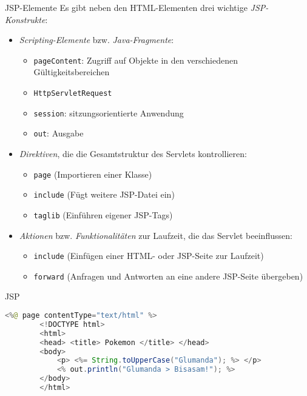 \begin{bonus}{JSP-Elemente}
    Es gibt neben den HTML-Elementen drei wichtige \emph{JSP-Konstrukte}:
    \begin{itemize}
        \item \emph{Scripting-Elemente} bzw. \emph{Java-Fragmente}:
              \begin{itemize}
                  \item \texttt{pageContent}: Zugriff auf Objekte in den verschiedenen Gültigkeitsbereichen
                  \item \texttt{HttpServletRequest}
                  \item \texttt{session}: sitzungsorientierte Anwendung
                  \item \texttt{out}: Ausgabe
              \end{itemize}
        \item \emph{Direktiven}, die die Gesamtstruktur des Servlets kontrollieren:
              \begin{itemize}
                  \item \texttt{page} (Importieren einer Klasse)
                  \item \texttt{include} (Fügt weitere JSP-Datei ein)
                  \item \texttt{taglib} (Einführen eigener JSP-Tags)
              \end{itemize}
        \item \emph{Aktionen} bzw. \emph{Funktionalitäten} zur Laufzeit, die das Servlet beeinflussen:
              \begin{itemize}
                  \item \texttt{include} (Einfügen einer HTML- oder JSP-Seite zur Laufzeit)
                  \item \texttt{forward} (Anfragen und Antworten an eine andere JSP-Seite übergeben)
              \end{itemize}
    \end{itemize}
\end{bonus}

\begin{example}{JSP}
    \begin{lstlisting}[language=Java, alsolanguage=html5]
        <%@ page contentType="text/html" %>
        <!DOCTYPE html>
        <html>
        <head> <title> Pokemon </title> </head>
        <body>
            <p> <%= String.toUpperCase("Glumanda"); %> </p>
            <% out.println("Glumanda > Bisasam!"); %>
        </body>
        </html>
    \end{lstlisting}
\end{example}

